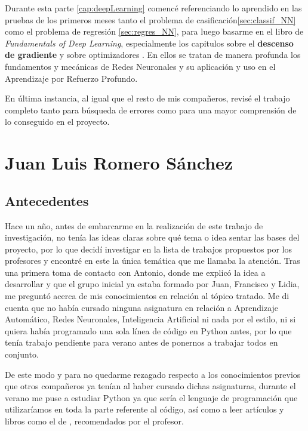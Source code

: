 Durante esta parte \ref{cap:deepLearning} comencé referenciando lo aprendido en las pruebas de los primeros meses tanto el problema de casificación\ref{sec:classif_NN} como el problema de regresión \ref{sec:regres_NN}, para luego basarme en el libro de \textit{Fundamentals of Deep Learning}, especialmente los capitulos sobre el \textbf{descenso de gradiente}\citep[cap. 2]{Buduma:general} y sobre  optimizadores\citep[cap. 4]{Buduma:general} . En ellos se tratan de manera profunda los fundamentos y mecánicas de Redes Neuronales y su aplicación y uso en el Aprendizaje por Refuerzo Profundo.

En última instancia, al igual que el resto de mis compañeros, revisé el trabajo completo tanto para búsqueda de errores como para una mayor comprensión de lo conseguido en el proyecto.

\section{Juan Luis Romero Sánchez}

\subsection{Antecedentes}

Hace un año, antes de embarcarme en la realización de este trabajo de investigación, no tenía las ideas claras sobre qué tema o idea sentar las bases del proyecto, por lo que decidí investigar en la lista de trabajos propuestos por los profesores y encontré en este la única temática que me llamaba la atención. Tras una primera toma de contacto con Antonio, donde me explicó la idea a desarrollar y que el grupo inicial ya estaba formado por Juan, Francisco y Lidia, me preguntó acerca de mis conocimientos en relación al tópico tratado. Me di cuenta que no había cursado ninguna asignatura en relación a Aprendizaje Automático, Redes Neuronales, Inteligencia Artificial ni nada por el estilo, ni si quiera había programado una sola línea de código en Python antes, por lo que tenía trabajo pendiente para verano antes de ponernos a trabajar todos en conjunto.

De este modo y para no quedarme rezagado respecto a los conocimientos previos que otros compañeros ya tenían al haber cursado dichas asignaturas, durante el verano me puse a estudiar Python ya que sería el lenguaje de programación que utilizaríamos en toda la parte referente al código, así como a leer artículos \citep{mnih2013playing} \citep{Turing1950-TURCMA} \citep{Rodriguez2018} y libros como el de \citet{Buduma:general}, recomendados por el profesor. 

